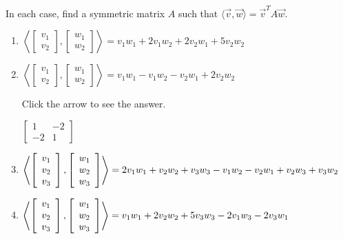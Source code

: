 \documentclass{ximera}
\begin{document}
\begin{problem}\label{prob:inner_prod_13}
In each case, find a symmetric matrix $A$ such that $\langle\vec{v}, \vec{w}\rangle = \vec{v}^{T}A\vec{w}$.


\begin{enumerate} 
\item
$  \left\langle
\left[ \begin{array}{r}
v_1 \\
v_2
\end{array} \right], \left[ \begin{array}{r}
w_1 \\
w_2
\end{array} \right]
\right\rangle
= v_1w_1 + 2v_1w_2 + 2v_2w_1 + 5v_2w_2$

\item
$\left\langle
\left[ \begin{array}{r}
v_1 \\
v_2
\end{array} \right], \left[ \begin{array}{r}
w_1 \\
w_2
\end{array} \right]
\right\rangle
= v_1w_1 - v_1w_2 - v_2w_1 + 2v_2w_2$

Click the arrow to see the answer.
\begin{expandable}{}{}
$\left[ \begin{array}{rr}
1 & -2 \\
-2 & 1
\end{array} \right]$
\end{expandable}

\item
$\left\langle
\left[ \begin{array}{r}
v_1 \\
v_2 \\
v_3
\end{array} \right], \left[ \begin{array}{r}
w_1 \\
w_2 \\
w_3
\end{array} \right]
\right\rangle
= 2v_1w_1 + v_2w_2 + v_3w_3 - v_1w_2 \\ -v_2w_1 + v_2w_3 + v_3w_2$

\item
$\left\langle
\left[ \begin{array}{r}
v_1 \\
v_2 \\
v_3
\end{array} \right], \left[ \begin{array}{r}
w_1 \\
w_2 \\
w_3
\end{array} \right]
\right\rangle
= v_1w_1 + 2v_2w_2 + 5v_3w_3 \\ - 2v_1w_3 - 2v_3w_1$


\end{enumerate}
\end{problem}
\end{document}
